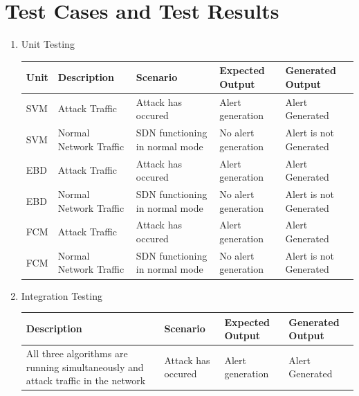 \documentclass[12pt,a4paper,final]{report}
\begin{document}
\section{Test Cases and Test Results}

\begin{enumerate}
\item\begin{flushleft}
Unit Testing 
\end{flushleft} 
	\begin{tabular}{|p{1cm}|p{3cm}|p{2.6cm}|p{2.5cm}|p{2.5cm}|}
	\hline 
	\textbf{Unit} & \textbf{Description} & \textbf{Scenario} & \textbf{Expected Output} & 		\textbf{Generated Output}\\ 
	\hline
	
	SVM & Attack Traffic & Attack has occured & Alert generation & Alert Generated\\
	\hline
	
	SVM & Normal Network Traffic & SDN functioning in normal mode & No alert generation & Alert is not Generated \\
	\hline
	
	EBD & Attack Traffic & Attack has occured & Alert generation & Alert Generated\\
	\hline
	
	EBD & Normal Network Traffic & SDN functioning in normal mode & No alert generation & Alert is not Generated \\
	\hline
	
	FCM & Attack Traffic & Attack has occured & Alert generation & Alert Generated\\
	\hline
	
	FCM & Normal Network Traffic & SDN functioning in normal mode & No alert generation & Alert is not Generated \\
	\hline
	
	\end{tabular}
	\linebreak
	
\item \begin{flushleft}
Integration Testing 
\end{flushleft} 
	\begin{tabular}{|p{3.5cm}|p{2.9cm}|p{2.5cm}|p{2.5cm}|}
	\hline 
	\textbf{Description} & \textbf{Scenario} & \textbf{Expected Output} & \textbf{Generated 		Output}\\ 
	\hline

	All three algorithms are running simultaneously and attack traffic in the network & Attack has occured & Alert generation & Alert Generated\\
	\hline
	

\end{tabular}
\end{enumerate}
\end{document}
